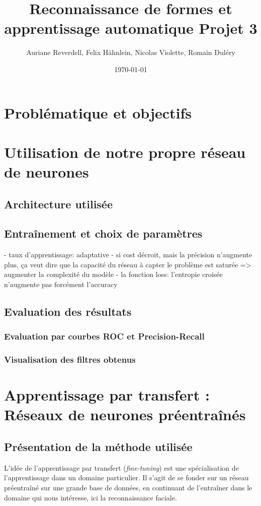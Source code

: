 \documentclass[a4paper,11pt]{article}
\title{Reconnaissance de formes et apprentissage automatique Projet 3}
\author{Auriane Reverdell, Felix Hähnlein, Nicolas Violette, Romain Duléry}
\date{\today}
\begin{document}
\maketitle
\vspace{1cm}

\section{Problématique et objectifs}

\section{Utilisation de notre propre réseau de neurones}
\subsection{Architecture utilisée}
\subsection{Entraînement et choix de paramètres}
- taux d'apprentissage: adaptative
- si cost décroit, mais la précision n'augmente plus, ça veut dire que la capacité du réseau à capter le problème est saturée => augmenter la complexité du modèle
- la fonction loss: l'entropie croisée n'augmente pas forcément l'accuracy
\subsection{Evaluation des résultats}
\subsubsection{Evaluation par courbes ROC et Precision-Recall}
\subsubsection{Visualisation des filtres obtenus}

\section{Apprentissage par transfert : Réseaux de neurones préentraînés}
\subsection{Présentation de la méthode utilisée}

L'idée de l'apprentissage par transfert (\textit{fine-tuning}) est une spécialisation de l'apprentissage dans un domaine particulier. Il s'agit de se fonder sur un réseau préentraîné sur une grande base de données, en continuant de l'entraîner dans le domaine qui nous intéresse, ici la reconnaissance faciale.
\end{document}
